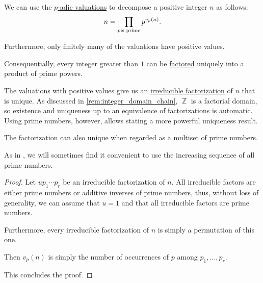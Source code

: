 \begin{theorem}\label{thm:fundamental_theorem_of_arithmetic}
  We can use the \hyperref[def:padic_valuation]{\( p \)-adic valuations} to decompose a positive integer \( n \) as follows:
  \begin{equation}\label{eq:thm:fundamental_theorem_of_arithmetic}
    n = \prod_{p \T{is prime}} p^{v_p(n)}.
  \end{equation}

  Furthermore, only finitely many of the valuations have positive values.
\end{theorem}
\begin{comments}
  \item Consequentially, every integer greater than \( 1 \) can be \hyperref[def:irreducible_factorization]{factored} uniquely into a product of prime powers.

  \item The valuations with positive values give us an \hyperref[def:irreducible_factorization]{irreducible factorization} of \( n \) that is unique. As discussed in \cref{rem:integer_domain_chain}, \( \BbbZ \) is a factorial domain, so existence and uniqueness up to an equivalence of factorizations is automatic. Using prime numbers, however, allows stating a more powerful uniqueness result.

  \item The factorization can also unique when regarded as a \hyperref[def:multiset]{multiset} of prime numbers.

  \item As in \cite[18]{Apostol1976AnalyticNumberTheory}, we will sometimes find it convenient to use the increasing sequence of all prime numbers.
\end{comments}
\begin{proof}
  Let \( u p_1 \cdots p_r \) be an irreducible factorization of \( n \). All irreducible factors are either prime numbers or additive inverses of prime numbers, thus, without loss of generality, we can assume that \( u = 1 \) and that all irreducible factors are prime numbers.

  Furthermore, every irreducible factorization of \( n \) is simply a permutation of this one.

  Then \( v_p(n) \) is simply the number of occurrences of \( p \) among \( p_1, \ldots, p_r \).

  This concludes the proof.
\end{proof}

